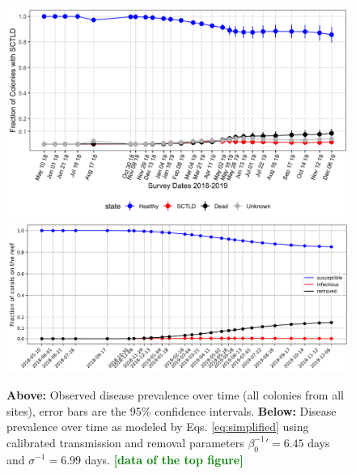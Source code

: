 \documentclass[utf8]{frontiersSCNS}
\newcommand{\erinn}[1]{\textbf{\textcolor{green}{#1}}}
\begin{document}
\begin{figure}
    \centering
    \includegraphics[width=.7\textwidth]{figures/image2.png}
    \includegraphics[width=.69\textwidth]{figures/sir_obs.png}
    \caption{\textbf{Above:} Observed disease prevalence over time (all colonies from all sites), error bars are the 95\% confidence intervals. \textbf{Below:} Disease prevalence over time as modeled by Eqs. \ref{eq:simplified} using calibrated transmission and removal parameters  $\beta_0^{-1}'=6.45$ days and $\sigma^{-1}=6.99$ days. \erinn{[data of the top figure]}}
    \label{fig:calibration}
\end{figure}
\end{document}
